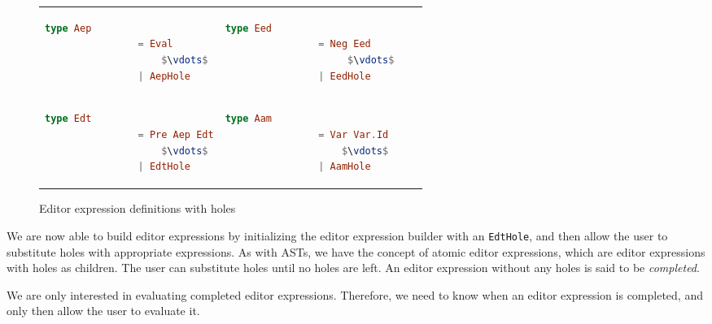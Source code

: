 \begin{figure}[H]
    \center
    \begin{tabular}{llll}

        \begin{lstlisting}[language=elm,%
                            gobble=8,%
                            mathescape,%
                            ]
             type Aep
                = Eval
                    $\vdots$
                | AepHole
        \end{lstlisting} &

        \begin{lstlisting}[language=elm,%
                            gobble=8,%
                            mathescape,%
                            ]
            type Eed
                = Neg Eed
                     $\vdots$
                | EedHole
        \end{lstlisting} \\

        \begin{lstlisting}[language=elm,%
                            gobble=8,%
                            mathescape,%
                            ]
            type Edt
                = Pre Aep Edt
                    $\vdots$
                | EdtHole
        \end{lstlisting} &

        \begin{lstlisting}[language=elm,%
                            gobble=8,%
                            mathescape,%
                            ]
            type Aam
                = Var Var.Id
                    $\vdots$
                | AamHole
        \end{lstlisting}
    \end{tabular}
    \caption{Editor expression definitions with holes}
    \label{fig:editorexpressionswithholes}
\end{figure}

We are now able to build editor expressions by initializing the editor
expression builder with an \texttt{EdtHole}, and then allow the user to
substitute holes with appropriate expressions. As with ASTs, we have the concept
of atomic editor expressions, which are editor expressions with holes as
children. The user can substitute holes until no holes are left. An editor
expression without any holes is said to be \textit{completed}.

We are only interested in evaluating completed editor expressions. Therefore, we
need to know when an editor expression is completed, and only then allow the
user to evaluate it.

